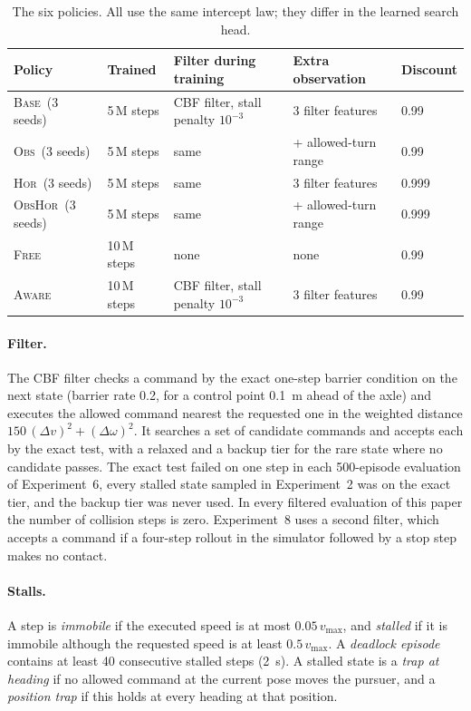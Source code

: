 \documentclass{l4dc2027}
\newcommand{\vmax}{v_{\max}}
\newcommand{\Base}{\textsc{Base}}
\newcommand{\Obs}{\textsc{Obs}}
\newcommand{\Hor}{\textsc{Hor}}
\newcommand{\ObsHor}{\textsc{ObsHor}}
\newcommand{\Free}{\textsc{Free}}
\newcommand{\Aware}{\textsc{Aware}}
\begin{document}
\begin{table}[t]
\centering\footnotesize
\caption{The six policies. All use the same intercept law; they differ in the learned search head.}
\label{tab:policies}
\setlength{\tabcolsep}{4pt}
\begin{tabular}{@{}lllll@{}}
\toprule
Policy & Trained & Filter during training & Extra observation & Discount \\
\midrule
\Base\ (3 seeds) & 5\,M steps & CBF filter, stall penalty $10^{-3}$ & 3 filter features & 0.99 \\
\Obs\ (3 seeds) & 5\,M steps & same & + allowed-turn range & 0.99 \\
\Hor\ (3 seeds) & 5\,M steps & same & 3 filter features & 0.999 \\
\ObsHor\ (3 seeds) & 5\,M steps & same & + allowed-turn range & 0.999 \\
\Free\ & 10\,M steps & none & none & 0.99 \\
\Aware\ & 10\,M steps & CBF filter, stall penalty $10^{-3}$ & 3 filter features & 0.99 \\
\bottomrule
\end{tabular}
\end{table}

\paragraph{Filter.} The CBF filter checks a command by the exact one-step barrier condition on the next state (barrier rate 0.2, for a control point \SI{0.1}{m} ahead of the axle) and executes the allowed command nearest the requested one in the weighted distance $150\,(\Delta v)^2 + (\Delta\omega)^2$. It searches a set of candidate commands and accepts each by the exact test, with a relaxed and a backup tier for the rare state where no candidate passes. The exact test failed on one step in each 500-episode evaluation of Experiment~6, every stalled state sampled in Experiment~2 was on the exact tier, and the backup tier was never used. In every filtered evaluation of this paper the number of collision steps is zero. Experiment~8 uses a second filter, which accepts a command if a four-step rollout in the simulator followed by a stop step makes no contact.

\paragraph{Stalls.} A step is \emph{immobile} if the executed speed is at most $0.05\,\vmax$, and \emph{stalled} if it is immobile although the requested speed is at least $0.5\,\vmax$. A \emph{deadlock episode} contains at least 40 consecutive stalled steps (\SI{2}{s}). A stalled state is a \emph{trap at heading} if no allowed command at the current pose moves the pursuer, and a \emph{position trap} if this holds at every heading at that position.
\end{document}
